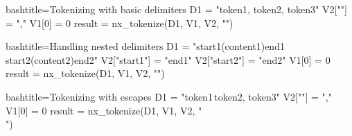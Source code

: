 \begin{NexCodeBox}{bash}{title={Tokenizing with basic delimiters}}
	D1 = "token1, token2, token3"
	V2[""] = ","
	V1[0] = 0
	result = nx_tokenize(D1, V1, V2, "")
\end{NexCodeBox}

\begin{NexCodeBox}{bash}{title={Handling nested delimiters}}
	D1 = "start1(content1)end1 start2(content2)end2"
	V2["start1"] = "end1"
	V2["start2"] = "end2"
	V1[0] = 0
	result = nx_tokenize(D1, V1, V2, "")
\end{NexCodeBox}

\begin{NexCodeBox}{bash}{title={Tokenizing with escapes}}
	D1 = "token1\,token2, token3"
	V2[""] = ","
	V1[0] = 0
	result = nx_tokenize(D1, V1, V2, "\\")
\end{NexCodeBox}

